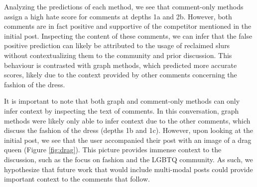 \documentclass[letterpaper]{article} %
\begin{document}
Analyzing the predictions of each method, we see that comment-only methods assign a high hate score for comments at depths 1a and 2b. However, both comments are in fact positive and supportive of the competitor mentioned in the initial post. Inspecting the content of these comments, we can infer that the false positive prediction can likely be attributed to the usage of reclaimed slurs without contextualizing them to the community and prior discussion. This behaviour is contrasted with graph methods, which predicted more accurate scores, likely due to the context provided by other comments concerning the fashion of the dress.

It is important to note that both graph and comment-only methods can only infer context by inspecting the text of comments. In this conversation, graph methods were likely only able to infer context due to the other comments, which discuss the fashion of the dress (depths 1b and 1c).  However, upon looking at the initial post, we see that the user accompanied their post with an image of a drag queen (Figure \ref{fig:drag}). This picture provides immense context to the discussion, such as the focus on fashion and the LGBTQ community. As such, we hypothesize that future work that would include multi-modal posts could provide important context to the comments that follow. 
\end{document}

